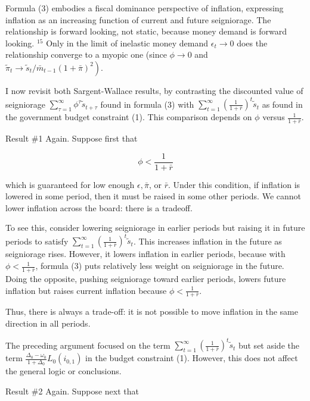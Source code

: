 \documentclass[10pt]{article}
\begin{document}
Formula (3) embodies a fiscal dominance perspective of inflation, expressing inflation as an increasing function of current and future seigniorage. The relationship is forward looking, not static, because money demand is forward looking. ${ }^{15}$ Only in the limit of inelastic money demand $\epsilon_{t} \rightarrow 0$ does the relationship converge to a myopic one (since $\phi \rightarrow 0$ and $\left.\tilde{\pi}_{t} \rightarrow \tilde{s}_{t} / \bar{m}_{t-1}(1+\bar{\pi})^{2}\right)$.

I now revisit both Sargent-Wallace results, by contrasting the discounted value of seigniorage $\sum_{\tau=1}^{\infty} \phi^{\tau} \tilde{s}_{t+\tau}$ found in formula (3) with $\sum_{t=1}^{\infty}\left(\frac{1}{1+\bar{r}}\right)^{t} \tilde{s}_{t}$ as found in the government budget constraint (1). This comparison depends on $\phi$ versus $\frac{1}{1+\bar{r}}$.

Result \#1 Again. Suppose first that

\begin{equation*}
\phi<\frac{1}{1+\bar{r}}
\end{equation*}

which is guaranteed for low enough $\epsilon, \bar{\pi}$, or $\bar{r}$. Under this condition, if inflation is lowered in some period, then it must be raised in some other periods. We cannot lower inflation across the board: there is a tradeoff.

To see this, consider lowering seigniorage in earlier periods but raising it in future periods to satisfy $\sum_{t=1}^{\infty}\left(\frac{1}{1+\bar{r}}\right)^{t} \tilde{s}_{t}$. This increases inflation in the future as seigniorage rises. However, it lowers inflation in earlier periods, because with $\phi<\frac{1}{1+\bar{r}}$, formula (3) puts relatively less weight on seigniorage in the future. Doing the opposite, pushing seigniorage toward earlier periods, lowers future inflation but raises current inflation because $\phi<\frac{1}{1+\bar{r}}$.

Thus, there is always a trade-off: it is not possible to move inflation in the same direction in all periods.

The preceding argument focused on the term $\sum_{t=1}^{\infty}\left(\frac{1}{1+\bar{r}}\right)^{t} \tilde{s}_{t}$ but set aside the term $\frac{\Delta_{0}-\omega_{0}}{1+\Delta_{0}} L_{0}\left(i_{0,1}\right)$ in the budget constraint (1). However, this does not affect the general logic or conclusions.

Result \#2 Again. Suppose next that
\end{document}
